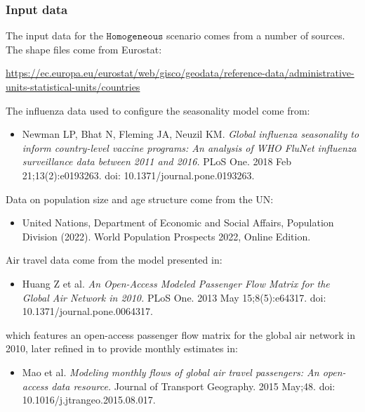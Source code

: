 \documentclass[10pt,letterpaper]{article}
\begin{document}
\subsubsection*{Input data}

The input data for the $\texttt{Homogeneous}$ scenario comes from a number of sources. The shape files come from Eurostat:

\begin{center}
\url{https://ec.europa.eu/eurostat/web/gisco/geodata/reference-data/administrative-units-statistical-units/countries}
\end{center}

\noindent The influenza data used to configure the seasonality model come from:

\begin{itemize}
\item[] Newman LP, Bhat N, Fleming JA, Neuzil KM. \textit{Global influenza seasonality to inform country-level vaccine programs: An analysis of WHO FluNet influenza surveillance data between 2011 and 2016.} PLoS One. 2018 Feb 21;13(2):e0193263. doi: 10.1371/journal.pone.0193263.
\end{itemize}

\noindent Data on population size and age structure come from the UN:

\begin{itemize}
\item[] United Nations, Department of Economic and Social Affairs, Population Division (2022). World Population Prospects 2022, Online Edition.
\end{itemize}

\noindent Air travel data come from the model presented in:

\begin{itemize}
\item[] Huang Z et al. \textit{An Open-Access Modeled Passenger Flow Matrix for the Global Air Network in 2010.} PLoS One. 2013 May 15;8(5):e64317. doi: 10.1371/journal.pone.0064317.
\end{itemize}

\noindent which features an open-access passenger flow matrix for the global air network in 2010, later refined in to provide monthly estimates in:

\begin{itemize}
\item[] Mao et al. \textit{Modeling monthly flows of global air travel passengers: An open-access data resource.} Journal of Transport Geography. 2015 May;48. doi: 10.1016/j.jtrangeo.2015.08.017.
\end{itemize}
\end{document}
